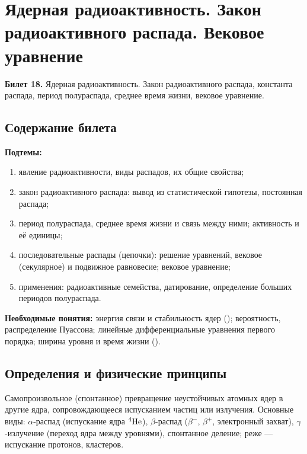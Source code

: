 \chapter[Радиоактивность. Закон распада. Вековое уравнение]%
        {Ядерная радиоактивность. Закон радиоактивного распада. Вековое уравнение}
\label{t:18}

\begin{qbox}
\textbf{Билет 18.} Ядерная радиоактивность. Закон радиоактивного распада, константа распада,
период полураспада, среднее время жизни, вековое уравнение.
\end{qbox}

\section{Содержание билета}

\textbf{Подтемы:}
\begin{enumerate}
 \item явление радиоактивности, виды распадов, их общие свойства;
 \item закон радиоактивного распада: вывод из статистической гипотезы, постоянная распада;
 \item период полураспада, среднее время жизни и связь между ними; активность и её единицы;
 \item последовательные распады (цепочки): решение уравнений, вековое (секулярное) и подвижное равновесие; вековое уравнение;
 \item применения: радиоактивные семейства, датирование, определение больших периодов полураспада.
\end{enumerate}

\textbf{Необходимые понятия:} энергия связи и стабильность ядер (); вероятность, распределение
Пуассона; линейные дифференциальные уравнения первого порядка; ширина уровня и время жизни ().

\section{Определения и физические принципы}

\begin{definition}[радиоактивность]
Самопроизвольное (спонтанное) превращение неустойчивых атомных ядер в другие ядра, сопровождающееся испусканием
частиц или излучения. Основные виды: $\alpha$-распад (испускание ядра $\nucl{He}{4}$), $\beta$-распад ($\beta^-$, $\beta^+$, электронный
захват), $\gamma$-излучение (переход ядра между уровнями), спонтанное деление; реже — испускание протонов, кластеров.
\end{definition}

